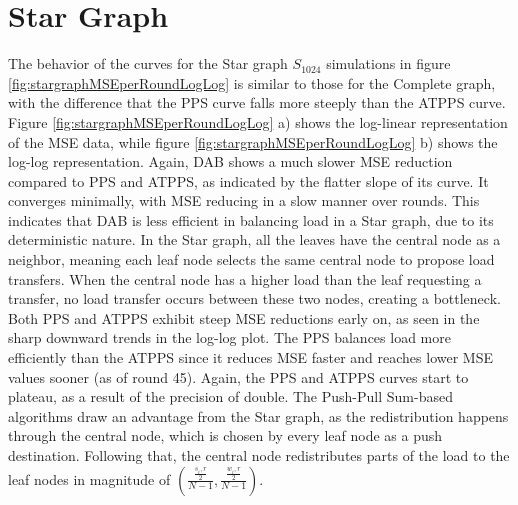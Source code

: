 \section{Star Graph}\label{sec:stargraph}
The behavior of the curves for the Star graph $S_{1024}$ simulations in figure \ref{fig:stargraphMSEperRoundLogLog} is similar to those for the Complete graph, with the difference that the PPS curve falls more steeply than the ATPPS curve. Figure \ref{fig:stargraphMSEperRoundLogLog} a) shows the log-linear representation of the MSE data, while figure \ref{fig:stargraphMSEperRoundLogLog} b) shows the log-log representation. Again, DAB shows a much slower MSE reduction compared to PPS and ATPPS, as indicated by the flatter slope of its curve. It converges minimally, with MSE reducing in a slow manner over rounds. This indicates that DAB is less efficient in balancing load in a Star graph, due to its deterministic nature. In the Star graph, all the leaves have the central node as a neighbor, meaning each leaf node selects the same central node to propose load transfers. When the central node has a higher load than the leaf requesting a transfer, no load transfer occurs between these two nodes, creating a bottleneck. Both PPS and ATPPS exhibit steep MSE reductions early on, as seen in the sharp downward trends in the log-log plot. The PPS balances load more efficiently than the ATPPS since it reduces MSE faster and reaches lower MSE values sooner (as of round 45). Again, the PPS and ATPPS curves start to plateau, as a result of the precision of double. The Push-Pull Sum-based algorithms draw an advantage from the Star graph, as the redistribution happens through the central node, which is chosen by every leaf node as a push destination. Following that, the central node redistributes parts of the load to the leaf nodes in magnitude of $\left(\frac{\frac{s_i,r}{2}}{N-1}, \frac{\frac{w_i,r}{2}}{N-1}\right)$.

